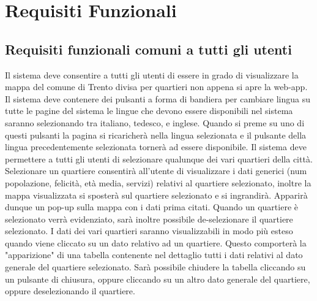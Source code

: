 \chapter{Requisiti Funzionali} 
\thispagestyle{stdPage}
    \section{Requisiti funzionali comuni a tutti gli utenti}
        \begin{rfList}
            \rfItem Il sistema deve consentire a tutti gli utenti di essere in grado di visualizzare la mappa del comune di Trento divisa per quartieri non appena si apre la web-app.
            \rfItem Il sistema deve contenere dei pulsanti a forma di bandiera per cambiare lingua su tutte le pagine del sistema le lingue che devono essere disponibili nel sistema saranno selezionando tra italiano, tedesco, e inglese. Quando si preme su uno di questi pulsanti la pagina si ricaricherà nella lingua selezionata e il pulsante della lingua precedentemente selezionata tornerà ad essere disponibile.
            \rfItem Il sistema deve permettere a tutti gli utenti di selezionare qualunque dei vari quartieri della città. Selezionare un quartiere consentirà all'utente di visualizzare i dati generici (num popolazione, felicità, età media, servizi) relativi al quartiere selezionato, inoltre la mappa visualizzata si sposterà sul quartiere selezionato e si ingrandirà. Apparirà dunque un pop-up sulla mappa con i dati prima citati. Quando un quartiere è selezionato verrà evidenziato, sarà inoltre possibile de-selezionare il quartiere selezionato.
            \rfItem I dati dei vari quartieri saranno visualizzabili in modo più esteso quando viene cliccato su un dato relativo ad un quartiere. Questo comporterà la "apparizione" di una tabella contenente nel dettaglio tutti i dati relativi al dato generale del quartiere selezionato. Sarà possibile chiudere la tabella cliccando su un pulsante di chiusura, oppure cliccando su un altro dato generale del quartiere, oppure deselezionando il quartiere.
        \end{rfList} 
